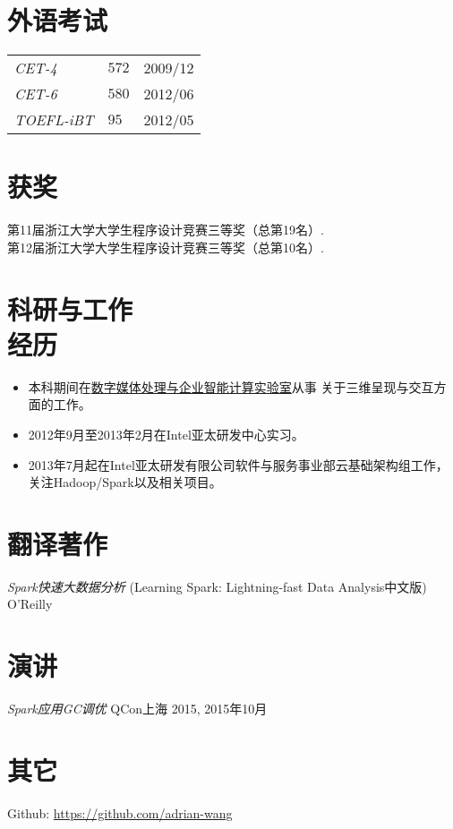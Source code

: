 \documentclass[line,margin]{res}
\begin{document}
\begin{resume}
\section{外语考试}
\begin{tabular}{p{}p{}p{}}
{\sl CET-4} &{$572$} &{\hfill 2009/12}\\
{\sl CET-6} &{$580$} &{\hfill 2012/06}\\
{\sl TOEFL-iBT} &{$95$} &{\hfill 2012/05}
\end{tabular}
\section{获奖}
            第11届浙江大学大学生程序设计竞赛三等奖（总第19名）.\\
            第12届浙江大学大学生程序设计竞赛三等奖（总第10名）.

\section{科研与工作\\经历}
            \begin{itemize}
            \item 本科期间在\href{http://give.zju.edu.cn}{数字媒体处理与企业智能计算实验室}从事
                关于三维呈现与交互方面的工作。
            \item 2012年9月至2013年2月在Intel亚太研发中心实习。
            \item 2013年7月起在Intel亚太研发有限公司软件与服务事业部云基础架构组工作，关注Hadoop/Spark以及相关项目。
            \end{itemize}

\section{翻译著作}
            {\sl Spark快速大数据分析} (Learning Spark: Lightning-fast Data Analysis中文版) \hfill O'Reilly

\section{演讲}
            {\sl Spark应用GC调优} \hfill QCon上海 2015, 2015年10月\\

\section{其它}
	Github: \href{https://github.com/adrian-wang}{https://github.com/adrian-wang}
\end{resume}
\end{document}
